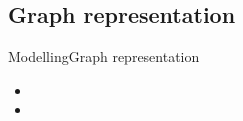 \subsection{Graph representation}

\begin{frame}{Modelling}{Graph representation}
\begin{itemize}
	\item<1->    
	\item<1->    
\end{itemize}
%  
\end{frame}







